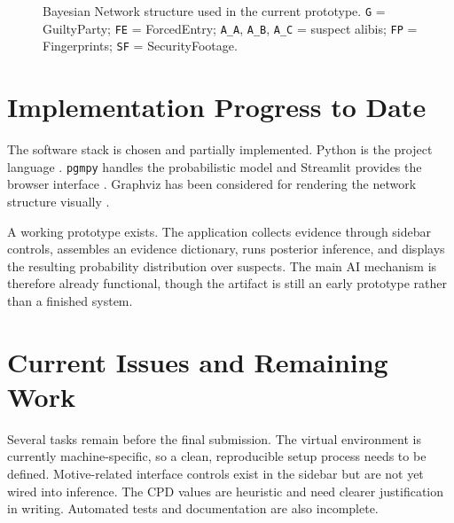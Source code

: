 \documentclass[conference]{IEEEtran}
\begin{document}
\begin{figure}[!h]
\centering
{}
\caption{Bayesian Network structure used in the current prototype. \texttt{G} = GuiltyParty; \texttt{FE} = ForcedEntry; \texttt{A\_A}, \texttt{A\_B}, \texttt{A\_C} = suspect alibis; \texttt{FP} = Fingerprints; \texttt{SF} = SecurityFootage.}
\label{fig:update_bn}
\end{figure}

\section{Implementation Progress to Date}
The software stack is chosen and partially implemented. Python is the project language \cite{pythondocs}. \texttt{pgmpy} handles the probabilistic model and Streamlit provides the browser interface \cite{streamlitdocs}. Graphviz has been considered for rendering the network structure visually \cite{graphvizdocs}.

A working prototype exists. The application collects evidence through sidebar controls, assembles an evidence dictionary, runs posterior inference, and displays the resulting probability distribution over suspects. The main AI mechanism is therefore already functional, though the artifact is still an early prototype rather than a finished system.

\section{Current Issues and Remaining Work}
Several tasks remain before the final submission. The virtual environment is currently machine-specific, so a clean, reproducible setup process needs to be defined. Motive-related interface controls exist in the sidebar but are not yet wired into inference. The CPD values are heuristic and need clearer justification in writing. Automated tests and documentation are also incomplete.
\end{document}
